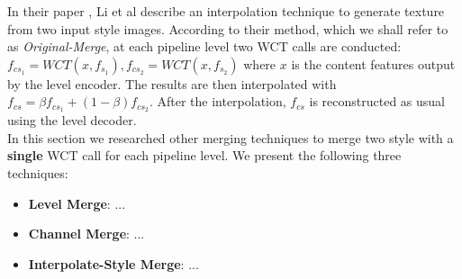 In their paper \cite{bib11}, Li et al describe an interpolation technique to generate texture from two input style images. According to their method, which we shall refer to as \textit{Original-Merge}, at each pipeline level two WCT calls are conducted: $f_{cs_1} = WCT(x, f_{s_1}), f_{cs_2} = WCT(x, f_{s_2})$ where $x$ is the content features output by the level encoder. The results are then interpolated with $f_{cs} = \beta f_{cs_1} + (1-\beta)f_{cs_2}$. After the interpolation, $f_{cs}$ is reconstructed as usual using the level decoder.\\

In this section we researched other merging techniques to merge two style with a \textbf{single} WCT call for each pipeline level. We present the following three techniques:

\begin{itemize}
	\item \textbf{Level Merge}: ...
	\item \textbf{Channel Merge}: ...
	\item \textbf{Interpolate-Style Merge}: ...
	
\end{itemize}
